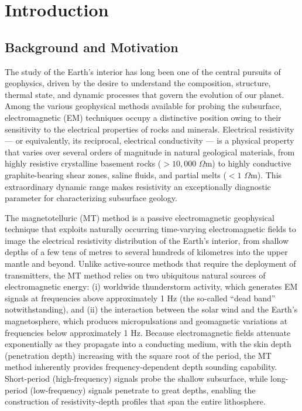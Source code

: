 \chapter{Introduction}

\section*{Background and Motivation}

The study of the Earth's interior has long been one of the central pursuits of geophysics, driven by the desire to understand the composition, structure, thermal state, and dynamic processes that govern the evolution of our planet. Among the various geophysical methods available for probing the subsurface, electromagnetic (EM) techniques occupy a distinctive position owing to their sensitivity to the electrical properties of rocks and minerals. Electrical resistivity --- or equivalently, its reciprocal, electrical conductivity --- is a physical property that varies over several orders of magnitude in natural geological materials, from highly resistive crystalline basement rocks ($>10{,}000$ $\Omega$m) to highly conductive graphite-bearing shear zones, saline fluids, and partial melts ($<1$ $\Omega$m). This extraordinary dynamic range makes resistivity an exceptionally diagnostic parameter for characterizing subsurface geology.

The magnetotelluric (MT) method is a passive electromagnetic geophysical technique that exploits naturally occurring time-varying electromagnetic fields to image the electrical resistivity distribution of the Earth's interior, from shallow depths of a few tens of metres to several hundreds of kilometres into the upper mantle and beyond. Unlike active-source methods that require the deployment of transmitters, the MT method relies on two ubiquitous natural sources of electromagnetic energy: (i) worldwide thunderstorm activity, which generates EM signals at frequencies above approximately 1 Hz (the so-called ``dead band'' notwithstanding), and (ii) the interaction between the solar wind and the Earth's magnetosphere, which produces micropulsations and geomagnetic variations at frequencies below approximately 1 Hz. Because electromagnetic fields attenuate exponentially as they propagate into a conducting medium, with the skin depth (penetration depth) increasing with the square root of the period, the MT method inherently provides frequency-dependent depth sounding capability. Short-period (high-frequency) signals probe the shallow subsurface, while long-period (low-frequency) signals penetrate to great depths, enabling the construction of resistivity-depth profiles that span the entire lithosphere.


